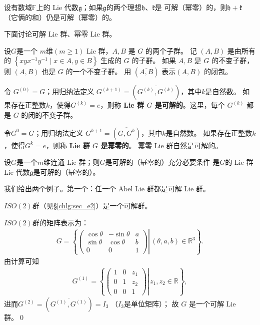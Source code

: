 \begin{proposition}\label{chlg:thm_isnosn}
    设有数域$\mathbb{F}$上的 Lie 代数$\mathfrak{g}$；如果$\mathfrak{g}$的两个理想$\mathfrak{h}$、$\mathfrak{k}$是
    可解（幂零）的，则$\mathfrak{h}+\mathfrak{k}$（它俩的和）仍是可解（幂零）的。
\end{proposition}





 

下面讨论可解 Lie 群、幂零 Lie 群。

设$G$是一个 $m$维$(m \geqslant 1)$ Lie 群，$A, B$ 是 $G$ 的两个子群。
记 $(A, B)$ 是由所有的 $\left\{x y x^{-1} y^{-1} \mid x \in A, y \in B\right\}$ 生成的 $G$ 的子群。
如果 $A, B$ 是 $G$ 的不变子群，则 $(A, B)$ 也是 $G$ 的一个不变子群。
用 $(\overline{A, B})$ 表示$(A, B)$ 的闭包。

令 $G^{(0)}=G$；用归纳法定义 $G^{(k+1)}=\left(\overline{G^{(k)}, G^{(k)}}\right)$，其中$k$是自然数。
如果存在正整数$k$，使得$G^{(k)}=e$，则称\textbf{ Lie 群 $G$ 是可解的}。这里，每个 $G^{(k)}$ 都是 $G$ 的闭的不变子群。

令$G^{0}=G$；用归纳法定义 $G^{k+1}=\left(\overline{G, G^{k}}\right)$，其中$k$是自然数。
如果存在正整数$k$，使得$G^{k}=e$，则称\textbf{ Lie 群 $G$ 是幂零的}。
幂零 Lie 群自然是可解的。

\begin{theorem}
    设$G$是一个$m$维连通 Lie 群；则$G$是可解的（幂零的）充分必要条件
    是$G$的 Lie 群 Lie 代数$\mathfrak{g}$是可解的（幂零的）。
\end{theorem}


我们给出两个例子。第一个：任一个 Abel  Lie 群都是可解 Lie 群。

\begin{example}
    $ISO(2)$群（见\S\ref{chlg:sec_e2}）是一个可解群。
\end{example}
$ISO(2)$群的矩阵表示为：
\begin{align*}
    G=\left\{\left.\left(\begin{array}{ccc}
        \cos \theta & -\sin \theta & a \\
        \sin \theta & \cos \theta & b \\
        0 & 0 & 1
    \end{array}\right) \right\rvert\,(\theta, a, b) \in \mathbb{R}^3\right\} .
\end{align*}
由计算可知
\begin{align*}
G^{(1)}=\left\{\left.\left(\begin{array}{ccc}
    1 & 0 & z_1 \\
    0 & 1 & z_2 \\
    0 & 0 & 1
\end{array}\right) \right\rvert\, z_1, z_2 \in \mathbb{R}\right\},
\end{align*}
进而$G^{(2)}=\left(\overline{G^{(1)}, G^{(1)}}\right)=I_3$ （$I_3$是单位矩阵）；
故 $G$ 是一个可解 Lie 群。\qed










